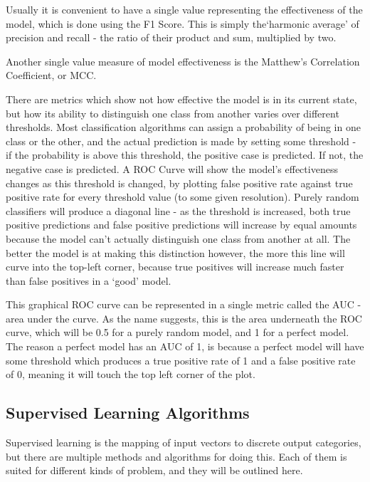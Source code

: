 Usually it is convenient to have a single value representing the effectiveness of the model, which is done using the F1 Score. This is simply the`harmonic average' of precision and recall - the ratio of their product and sum, multiplied by two.

Another single value measure of model effectiveness is the Matthew's Correlation Coefficient, or MCC. 

There are metrics which show not how effective the model is in its current state, but how its ability to distinguish one class from another varies over different thresholds. Most classification algorithms can assign a probability of being in one class or the other, and the actual prediction is made by setting some threshold - if the probability is above this threshold, the positive case is predicted. If not, the negative case is predicted. A ROC Curve will show the model's effectiveness changes as this threshold is changed, by plotting false positive rate against true positive rate for every threshold value (to some given resolution). Purely random classifiers will produce a diagonal line - as the threshold is increased, both true positive predictions and false positive predictions will increase by equal amounts because the model can't actually distinguish one class from another at all. The better the model is at making this distinction however, the more this line will curve into the top-left corner, because true positives will increase much faster than false positives in a `good' model.

This graphical ROC curve can be represented in a single metric called the AUC - area under the curve. As the name suggests, this is the area underneath the ROC curve, which will be 0.5 for a purely random model, and 1 for a perfect model. The reason a perfect model has an AUC of 1, is because a perfect model will have some threshold which produces a true positive rate of 1 and a false positive rate of 0, meaning it will touch the top left corner of the plot.

\subsection{Supervised Learning Algorithms}

Supervised learning is the mapping of input vectors to discrete output categories, but there are multiple methods and algorithms for doing this. Each of them is suited for different kinds of problem, and they will be outlined here.

